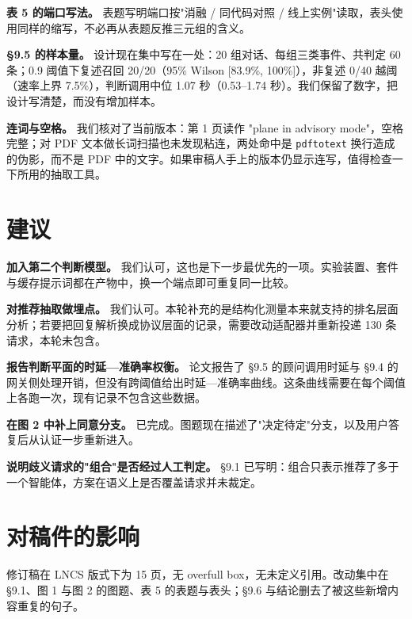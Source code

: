 \documentclass[11pt,a4paper]{article}
\begin{document}
\textbf{表 5 的端口写法。} 表题写明端口按"消融 / 同代码对照 / 线上实例"读取，表头使用同样的缩写，不必再从表题反推三元组的含义。

\textbf{§9.5 的样本量。} 设计现在集中写在一处：20 组对话、每组三类事件、共判定 60 条；0.9 阈值下复述召回 20/20（95\% Wilson [83.9\%, 100\%]），非复述 0/40 越阈（速率上界 7.5\%），判断调用中位 1.07 秒（0.53–1.74 秒）。我们保留了数字，把设计写清楚，而没有增加样本。

\textbf{连词与空格。} 我们核对了当前版本：第 1 页读作 "plane in advisory mode"，空格完整；对 PDF 文本做长词扫描也未发现粘连，两处命中是 \texttt{pdftotext} 换行造成的伪影，而不是 PDF 中的文字。如果审稿人手上的版本仍显示连写，值得检查一下所用的抽取工具。

\section*{建议}
\textbf{加入第二个判断模型。} 我们认可，这也是下一步最优先的一项。实验装置、套件与缓存提示词都在产物中，换一个端点即可重复同一比较。

\textbf{对推荐抽取做埋点。} 我们认可。本轮补充的是结构化测量本来就支持的排名层面分析；若要把回复解析换成协议层面的记录，需要改动适配器并重新投递 130 条请求，本轮未包含。

\textbf{报告判断平面的时延—准确率权衡。} 论文报告了 §9.5 的顾问调用时延与 §9.4 的网关侧处理开销，但没有跨阈值给出时延—准确率曲线。这条曲线需要在每个阈值上各跑一次，现有记录不包含这些数据。

\textbf{在图 2 中补上同意分支。} 已完成。图题现在描述了"决定待定"分支，以及用户答复后从认证一步重新进入。

\textbf{说明歧义请求的"组合"是否经过人工判定。} §9.1 已写明：组合只表示推荐了多于一个智能体，方案在语义上是否覆盖请求并未裁定。

\section*{对稿件的影响}
修订稿在 LNCS 版式下为 15 页，无 overfull box，无未定义引用。改动集中在 §9.1、图 1 与图 2 的图题、表 5 的表题与表头；§9.6 与结论删去了被这些新增内容重复的句子。
\end{document}
